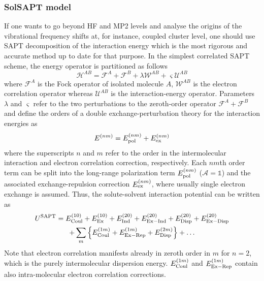 \documentclass[a4paper,titlepage,twoside,fleqn,12pt]{book}
\begin{document}
\begin{refsection}
\subsubsection{SolSAPT model\label{s:solsapt}}

If one wants to go beyond HF and MP2 levels and
analyse the origins of the vibrational frequency 
shifts at, for instance, coupled cluster
level, one should use SAPT decomposition of the interaction
energy which is
the most rigorous and accurate method up to date for that purpose.
In the simplest correlated SAPT scheme, the energy operator
is partitioned as follows
%
\begin{equation}
 \mathscr{H}^{AB} = \mathscr{F}^{A} + \mathscr{F}^{B} + \lambda \mathscr{W}^{AB} + \varsigma \mathscr{U}^{AB}
\end{equation}
%
where $\mathscr{F}^{A}$ is the Fock operator of isolated molecule $A$, 
$\mathscr{W}^{AB}$ is the electron correlation operator 
whereas $\mathscr{U}^{AB}$ is the interaction\hyp{}energy operator.
Parameters $\lambda$ and $\varsigma$ refer to the two perturbations
to the zeroth\hyp{}order operator $\mathscr{F}^{A}+\mathscr{F}^{B}$
and define the orders of a double exchange\hyp{}perturbation theory
for the interaction energies as
%
\begin{equation}
  E^{(nm)} =  E^{(nm)}_{\rm pol} +  E^{(nm)}_{\rm ex}
\end{equation}
%
where the superscripts $n$ and $m$ refer to the order in the
intermolecular interaction and electron correlation correction,
respectively. Each $nm$th order term can be split into the long\hyp{}range
polarization term $E^{(nm)}_{\rm pol}$ ($\mathscr{A}=\mathbb{1}$)
and the associated exchange\hyp{}repulsion correction $E^{(nm)}_{\rm ex}$,
where usually single electron exchange is assumed.
Thus, the solute\hyp{}solvent interaction potential can be written as
%
\begin{multline}
U^{\rm SAPT} =
         E^{(10)}_{\rm Coul} + E^{(10)}_{\rm Ex} + 
         E^{(20)}_{\rm Ind}  + E^{(20)}_{\rm Ex-Ind} +
         E^{(20)}_{\rm Disp} + E^{(20)}_{\rm Ex-Disp} \\ +
     \sum_m \left\{ E^{(1m)}_{\rm Coul} + E^{(1m)}_{\rm Ex-Rep} + E^{(2m)}_{\rm Disp}\right\} 
     + \ldots
\end{multline}
%
Note that electron correlation manifests
already in zeroth order in $m$ for $n=2$, which is the purely intermolecular
dispersion energy. $E^{(1m)}_{\rm Coul}$ and $E^{(1m)}_{\rm Ex-Rep}$
contain also intra\hyp{}molecular electron correlation corrections.

\end{refsection}
\end{document}
